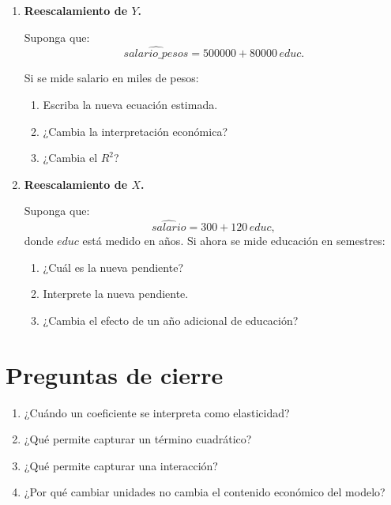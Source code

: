 \documentclass[11pt]{article}
\begin{document}
\begin{enumerate}[label=\textbf{Ejercicio \arabic*.}, leftmargin=*]
\item \textbf{Reescalamiento de \(Y\).}

Suponga que:
\[
\widehat{salario\_pesos}=500000+80000\,educ.
\]

Si se mide salario en miles de pesos:
\begin{enumerate}[label=\alph*)]
    \item Escriba la nueva ecuación estimada.
    \item ¿Cambia la interpretación económica?
    \item ¿Cambia el \(R^2\)?
\end{enumerate}

\item \textbf{Reescalamiento de \(X\).}

Suponga que:
\[
\widehat{salario}=300+120\,educ,
\]
donde \(educ\) está medido en años. Si ahora se mide educación en semestres:

\begin{enumerate}[label=\alph*)]
    \item ¿Cuál es la nueva pendiente?
    \item Interprete la nueva pendiente.
    \item ¿Cambia el efecto de un año adicional de educación?
\end{enumerate}

\end{enumerate}

\section*{Preguntas de cierre}

\begin{enumerate}[label=\arabic*.]
    \item ¿Cuándo un coeficiente se interpreta como elasticidad?
    \item ¿Qué permite capturar un término cuadrático?
    \item ¿Qué permite capturar una interacción?
    \item ¿Por qué cambiar unidades no cambia el contenido económico del modelo?
\end{enumerate}
\end{document}
